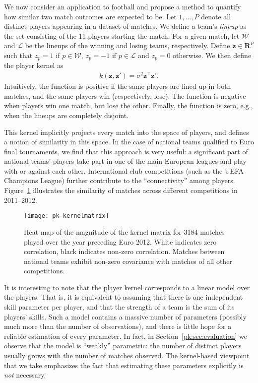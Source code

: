 We now consider an application to football and propose a method to quantify how similar two match outcomes are expected to be.
Let $1, \dots, P$ denote all distinct players appearing in a dataset of matches.
We define a team's \emph{lineup} as the set consisting of the \num{11} players starting the match.
For a given match, let $\mathcal{W}$ and $\mathcal{L}$ be the lineups of the winning and losing teams, respectively.
Define $\bm{z} \in \mathbf{R}^P$ such that $z_p = 1$ if $p \in \mathcal{W}$, $z_p = -1$ if $p \in \mathcal{L}$ and $z_p = 0$ otherwise.
We then define the player kernel as
\begin{align*}
k(\bm{z}, \bm{z}') = \sigma^2 \bm{z}^\top \bm{z}'.
\end{align*}
Intuitively, the function is positive if the same players are lined up in both matches, and the same players win (respectively, lose).
The function is negative when players win one match, but lose the other.
Finally, the function is zero, e.g., when the lineups are completely disjoint.

This kernel implicitly projects every match into the space of players, and defines a notion of similarity in this space.
In the case of national teams qualified to Euro final tournaments, we find that this approach is very useful: a significant part of national teams' players take part in one of the main European leagues and play with or against each other.
International club competitions (such as the UEFA Champions League) further contribute to the ``connectivity'' among players.
Figure~\ref{pk:fig:kernel} illustrates the similarity of matches across different competitions in 2011--2012.


\begin{figure}
  \centering
  \texttt{[image: pk-kernelmatrix]}
  \caption{Heat map of the magnitude of the kernel matrix for \num{3184} matches played over the year preceding Euro 2012.
White indicates zero correlation, black indicates non-zero correlation.
Matches between national teams exhibit non-zero covariance with matches of all other competitions.
}
  \label{pk:fig:kernel}
\end{figure}

It is interesting to note that the player kernel corresponds to a linear model over the players.
That is, it is equivalent to assuming that there is one independent skill parameter per player, and that the strength of a team is the sum of its players' skills.
Such a model contains a massive number of parameters (possibly much more than the number of observations), and there is little hope for a reliable estimation of every parameter.
In fact, in Section~\ref{pk:sec:evaluation} we observe that the model is ``weakly'' parametric: the number of distinct players usually grows with the number of matches observed.
The kernel-based viewpoint that we take emphasizes the fact that estimating these parameters explicitly is \emph{not} necessary.

